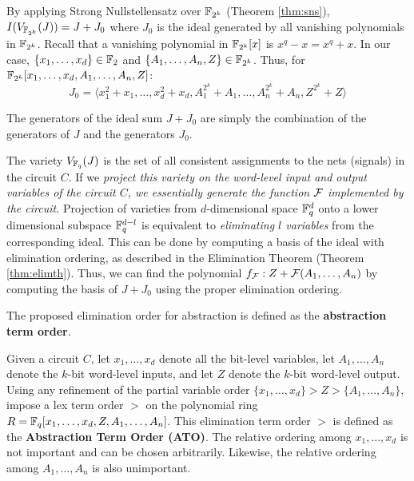 By applying Strong Nullstellensatz over ${\mathbb{F}}_{2^k}$ (Theorem \ref{thm:sns}), 
$I(V_{{\mathbb{F}}_{2^k}}(J))=J+J_0$ where
$J_0$ is the ideal generated by all vanishing polynomials in ${\mathbb{F}}_{2^k}$. 
Recall that a vanishing polynomial in ${\mathbb{F}}_{2^k}[x]$ is $x^q-x=x^q+x$. 
In our case, 
$\{x_1,\dots,x_d\} \in {\mathbb{F}}_2$ and $\{A_1,\dots,A_n,Z\} \in {\mathbb{F}}_{2^k}$.
Thus, for ${\mathbb{F}}_{2^k}[x_1,\dots,x_d,A_1,\dots,A_n,Z]$: 
\begin{equation}
J_0 = \langle x_1^2+x_1,\dots,x_d^2+x_d, A_1^{2^k}+A_1,\dots,A_n^{2^k}+A_n,Z^{2^k}+Z\rangle \nonumber
\end{equation}

The generators of the ideal sum $J+J_0$ are simply the combination of the 
generators of $J$ and the generators $J_0$.



The variety $V_{{\mathbb{F}}_{q}}(J)$ is
the set of all consistent assignments to the nets (signals) in the
circuit $C$. If we {\it project this variety on the word-level input and
output variables of the circuit $C$, we essentially generate the
function ${\mathcal{F}}$ implemented by the circuit.} Projection of varieties from
$d$-dimensional space ${\mathbb{F}}_{q}^d$ onto a lower dimensional subspace
${\mathbb{F}}_{q}^{d-l}$ is equivalent to {\it eliminating $l$ variables} from the
corresponding ideal. This can be done by computing a \Grobner basis
of the ideal with elimination ordering, as described in the 
Elimination Theorem (Theorem \ref{thm:elimth}).
Thus, we can find the polynomial 
$f_{\mathcal{F}}:Z+{\mathcal{F}}(A_1,\dots,A_n)$ by computing the \Grobner
basis of $J+J_0$ using the proper elimination ordering.

The proposed elimination order for 
abstraction is defined as the {\bf abstraction term order}. 
\begin{Definition}
\label{def:ato}
Given a circuit $C$,
let $x_1, \dots, x_d$ denote all the bit-level variables, 
let $A_1,\dots,A_n$ denote the $k$-bit word-level inputs, 
and let $Z$ denote the $k$-bit word-level output. 
Using any refinement of the partial variable order 
$\{x_1, \dots, x_d\} > Z > \{A_1, \dots, A_n\}$,
impose a lex term order $>$ on the polynomial ring 
$R = {\mathbb{F}}_{q}[x_1, \dots, x_d, Z, A_1, \dots, A_n]$. 
This elimination term order $>$ is defined as
the {\bf Abstraction Term Order (ATO)}. The relative ordering among $x_1,
\dots, x_d$ is not important and can be chosen arbitrarily. Likewise,
the relative ordering among $A_1, \dots, A_n$ is also unimportant.
\end{Definition}

